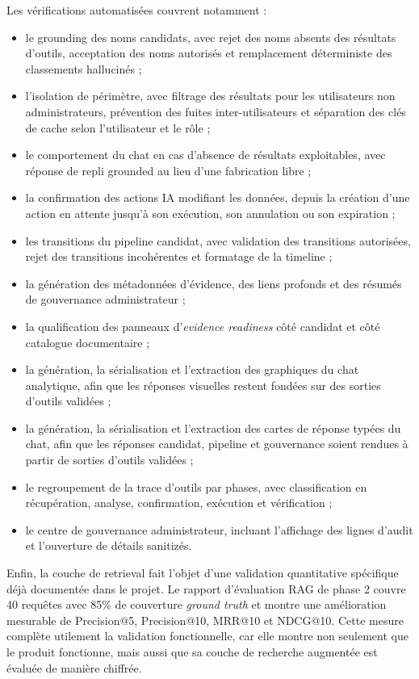 Les vérifications automatisées couvrent notamment :
\begin{itemize}
  \item le grounding des noms candidats, avec rejet des noms absents des résultats d'outils, acceptation des noms autorisés et remplacement déterministe des classements hallucinés ;
  \item l'isolation de périmètre, avec filtrage des résultats pour les utilisateurs non administrateurs, prévention des fuites inter-utilisateurs et séparation des clés de cache selon l'utilisateur et le rôle ;
  \item le comportement du chat en cas d'absence de résultats exploitables, avec réponse de repli grounded au lieu d'une fabrication libre ;
  \item la confirmation des actions IA modifiant les données, depuis la création d'une action en attente jusqu'à son exécution, son annulation ou son expiration ;
  \item les transitions du pipeline candidat, avec validation des transitions autorisées, rejet des transitions incohérentes et formatage de la timeline ;
  \item la génération des métadonnées d'évidence, des liens profonds et des résumés de gouvernance administrateur ;
  \item la qualification des panneaux d'\textit{evidence readiness} côté candidat et côté catalogue documentaire ;
  \item la génération, la sérialisation et l'extraction des graphiques du chat analytique, afin que les réponses visuelles restent fondées sur des sorties d'outils validées ;
  \item la génération, la sérialisation et l'extraction des cartes de réponse typées du chat, afin que les réponses candidat, pipeline et gouvernance soient rendues à partir de sorties d'outils validées ;
  \item le regroupement de la trace d'outils par phases, avec classification en récupération, analyse, confirmation, exécution et vérification ;
  \item le centre de gouvernance administrateur, incluant l'affichage des lignes d'audit et l'ouverture de détails sanitizés.
\end{itemize}

Enfin, la couche de retrieval fait l'objet d'une validation quantitative spécifique déjà documentée dans le projet. Le rapport d'évaluation RAG de phase 2 couvre 40 requêtes avec 85\% de couverture \textit{ground truth} et montre une amélioration mesurable de Precision@5, Precision@10, MRR@10 et NDCG@10. Cette mesure complète utilement la validation fonctionnelle, car elle montre non seulement que le produit fonctionne, mais aussi que sa couche de recherche augmentée est évaluée de manière chiffrée.

